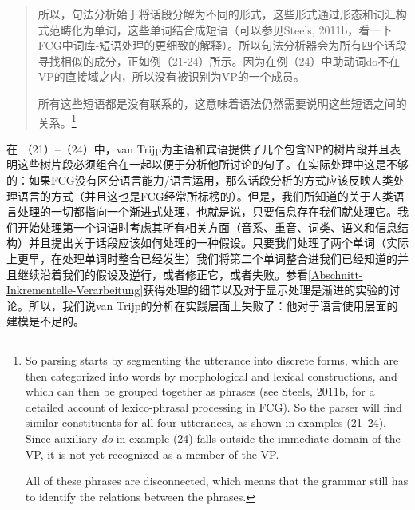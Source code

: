 \begin{quotation}
所以，句法分析始于将话段分解为不同的形式，这些形式通过形态和词汇构式范畴化为单词，这些单词结合成短语（可以参见Steels, 2011b，看一下FCG中词库-短语处理的更细致的解释）。所以句法分析器会为所有四个话段寻找相似的成分，正如例（21-24）所示。因为在例（24）中助动词do不在VP的直接域之内，所以没有被识别为VP的一个成员。

所有这些短语都是没有联系的，这意味着语法仍然需要说明这些短语之间的关系。\citep[]{vanTrijp2014a}\footnote{
So parsing starts by segmenting the utterance
into discrete forms, which are then categorized into words by morphological
and lexical constructions, and which can then be grouped together as
phrases (see Steels, 2011b, for a detailed account of lexico-phrasal
processing in FCG). So the parser will find similar constituents for all
four utterances, as shown in examples (21--24). Since auxiliary-\emph{do} in
example (24) falls outside the immediate domain of the VP, it is not yet
recognized as a member of the VP.

All of these phrases are disconnected, which means that the grammar
still has to identify the relations between the phrases. 
}
\end{quotation}
在 （21）--（24）中，van Trijp为主语和宾语提供了几个包含NP的树片段并且表明这些树片段必须组合在一起以便于分析他所讨论的句子。在实际处理中这是不够的：如果FCG没有区分语言能力/语言运用，那么话段分析的方式应该反映人类处理语言的方式（并且这也是FCG经常所标榜的）。但是，我们所知道的关于人类语言处理的一切都指向一个渐进式处理，也就是说，只要信息存在我们就处理它。我们开始处理第一个词语时考虑其所有相关方面（音系、重音、词类、语义和信息结构）并且提出关于话段应该如何处理的一种假设。只要我们处理了两个单词（实际上更早，在处理单词时整合已经发生）我们将第二个单词整合进我们已经知道的并且继续沿着我们的假设及逆行，或者修正它，或者失败。参看\ref{Abschnitt-Inkrementelle-Verarbeitung}获得处理的细节以及对于显示处理是渐进的实验的讨论。所以，我们说van Trijp的分析在实践层面上失败了：他对于语言使用层面的建模是不足的。
